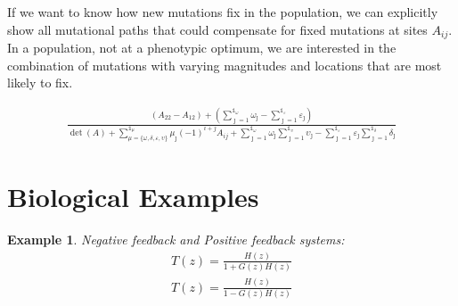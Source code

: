 \documentclass[11 pt]{article}
\newcommand{\ind}{\mathds{1}}
\newtheorem{example}{Example}
\begin{document}

  If we want to know how new mutations fix in the population, we can explicitly show all mutational paths that could compensate for fixed mutations at sites $A_{ij}$. In a population, not at a phenotypic optimum, we are interested in the combination of mutations with varying magnitudes and locations that are most likely to fix. 

  \begin{align*}
    \frac{\left(A_{22}-A_{12}\right) + \left( \displaystyle\sum_{\jmath = 1}^{\ind_{\omega}} \omega_{\jmath} - \displaystyle\sum_{\jmath = 1}^{\ind_{\varepsilon}} \varepsilon_{\jmath} \right)}{\det(A) + \displaystyle\sum_{\mu=\{\omega , \delta , \varepsilon , \upsilon \}}^{\ind_{\mu}} \mu_{\jmath} (-1)^{i+j} A_{ij} + \sum_{\jmath=1}^{\ind_{\omega}} \omega_{\jmath} \sum_{\jmath=1}^{\ind_{\upsilon}} \upsilon_{\jmath} - \sum_{\jmath=1}^{\ind_{\varepsilon}} \varepsilon_{\jmath} \sum_{\jmath=1}^{\ind_{\delta}} \delta_{\jmath} }
  \end{align*}


\section{Biological Examples}\label{sec:examples}

  \begin{example}
    Negative feedback and Positive feedback systems:
    \begin{align*}
      T(z) = \frac{H(z)}{1 + G(z)H(z)} \\
      T(z) = \frac{H(z)}{1 - G(z)H(z)} \\
    \end{align*}
  \end{example}
\end{document}
